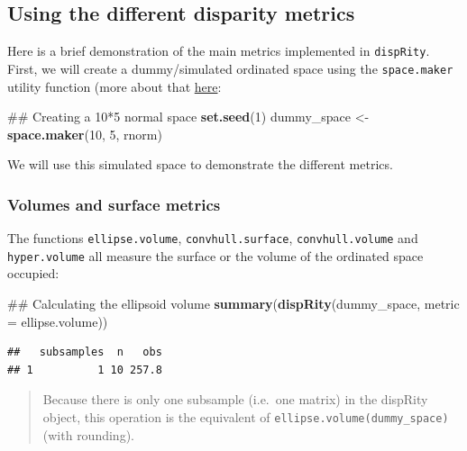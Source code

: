 \documentclass[]{book}
\newenvironment{Shaded}{\begin{snugshade}}{\end{snugshade}}
\newcommand{\KeywordTok}[1]{\textcolor[rgb]{0.13,0.29,0.53}{\textbf{#1}}}
\newcommand{\DataTypeTok}[1]{\textcolor[rgb]{0.13,0.29,0.53}{#1}}
\newcommand{\DecValTok}[1]{\textcolor[rgb]{0.00,0.00,0.81}{#1}}
\newcommand{\StringTok}[1]{\textcolor[rgb]{0.31,0.60,0.02}{#1}}
\newcommand{\NormalTok}[1]{#1}
\theoremstyle{definition}
\theoremstyle{definition}
\theoremstyle{remark}
\begin{document}
\subsection{Using the different disparity
metrics}\label{using-the-different-disparity-metrics}

Here is a brief demonstration of the main metrics implemented in
\texttt{dispRity}. First, we will create a dummy/simulated ordinated
space using the \texttt{space.maker} utility function (more about that
\protect\hyperlink{space.maker}{here}:

\begin{Shaded}
\begin{Highlighting}[]
\NormalTok{## Creating a 10*5 normal space}
\KeywordTok{set.seed}\NormalTok{(}\DecValTok{1}\NormalTok{)}
\NormalTok{dummy_space <-}\StringTok{ }\KeywordTok{space.maker}\NormalTok{(}\DecValTok{10}\NormalTok{, }\DecValTok{5}\NormalTok{, rnorm)}
\end{Highlighting}
\end{Shaded}

We will use this simulated space to demonstrate the different metrics.

\subsubsection{Volumes and surface
metrics}\label{volumes-and-surface-metrics}

The functions \texttt{ellipse.volume}, \texttt{convhull.surface},
\texttt{convhull.volume} and \texttt{hyper.volume} all measure the
surface or the volume of the ordinated space occupied:

\begin{Shaded}
\begin{Highlighting}[]
\NormalTok{## Calculating the ellipsoid volume}
\KeywordTok{summary}\NormalTok{(}\KeywordTok{dispRity}\NormalTok{(dummy_space, }\DataTypeTok{metric =}\NormalTok{ ellipse.volume))}
\end{Highlighting}
\end{Shaded}

\begin{verbatim}
##   subsamples  n   obs
## 1          1 10 257.8
\end{verbatim}

\begin{quote}
Because there is only one subsample (i.e.~one matrix) in the dispRity
object, this operation is the equivalent of
\texttt{ellipse.volume(dummy\_space)} (with rounding).
\end{quote}
\end{document}
